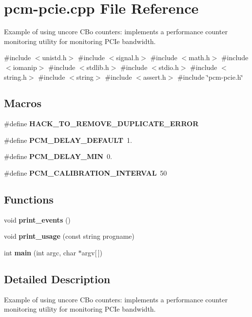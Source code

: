 \section{pcm-\/pcie.cpp File Reference}
\label{pcm-pcie_8cpp}


Example of using uncore C\+Bo counters\+: implements a performance counter monitoring utility for monitoring P\+C\+Ie bandwidth.  


{\ttfamily \#include $<$unistd.\+h$>$}\newline
{\ttfamily \#include $<$signal.\+h$>$}\newline
{\ttfamily \#include $<$math.\+h$>$}\newline
{\ttfamily \#include $<$iomanip$>$}\newline
{\ttfamily \#include $<$stdlib.\+h$>$}\newline
{\ttfamily \#include $<$stdio.\+h$>$}\newline
{\ttfamily \#include $<$string.\+h$>$}\newline
{\ttfamily \#include $<$string$>$}\newline
{\ttfamily \#include $<$assert.\+h$>$}\newline
{\ttfamily \#include \char`\"{}pcm-\/pcie.\+h\char`\"{}}\newline
\subsection*{Macros}
\begin{DoxyCompactItemize}
\item 
\mbox{\label{pcm-pcie_8cpp_ac4eeb11d89b0f517835a12a04443ebe4}} 
\#define {\bfseries H\+A\+C\+K\+\_\+\+T\+O\+\_\+\+R\+E\+M\+O\+V\+E\+\_\+\+D\+U\+P\+L\+I\+C\+A\+T\+E\+\_\+\+E\+R\+R\+OR}
\item 
\mbox{\label{pcm-pcie_8cpp_aa9ecc55c90c7a69729babc4f5f91ed96}} 
\#define {\bfseries P\+C\+M\+\_\+\+D\+E\+L\+A\+Y\+\_\+\+D\+E\+F\+A\+U\+LT}~1.
\item 
\mbox{\label{pcm-pcie_8cpp_acccbe8441d6dd75bdc949f5f0ee126c5}} 
\#define {\bfseries P\+C\+M\+\_\+\+D\+E\+L\+A\+Y\+\_\+\+M\+IN}~0.
\item 
\mbox{\label{pcm-pcie_8cpp_a433dde946b6713059756318598c9a6fe}} 
\#define {\bfseries P\+C\+M\+\_\+\+C\+A\+L\+I\+B\+R\+A\+T\+I\+O\+N\+\_\+\+I\+N\+T\+E\+R\+V\+AL}~50
\end{DoxyCompactItemize}
\subsection*{Functions}
\begin{DoxyCompactItemize}
\item 
\mbox{\label{pcm-pcie_8cpp_a3193d1a8ca2451055cda0dc7cb39b71d}} 
void {\bfseries print\+\_\+events} ()
\item 
\mbox{\label{pcm-pcie_8cpp_a4e43544978d9afb2faf08dce11cab70c}} 
void {\bfseries print\+\_\+usage} (const string progname)
\item 
\mbox{\label{pcm-pcie_8cpp_a0ddf1224851353fc92bfbff6f499fa97}} 
int {\bfseries main} (int argc, char $\ast$argv[$\,$])
\end{DoxyCompactItemize}


\subsection{Detailed Description}
Example of using uncore C\+Bo counters\+: implements a performance counter monitoring utility for monitoring P\+C\+Ie bandwidth. 

